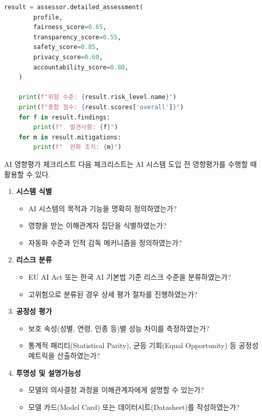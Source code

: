 \begin{lstlisting}[language=Python, caption={AI 영향평가 자동화 도구}, label={lst:impact_assessment}]
    result = assessor.detailed_assessment(
        profile,
        fairness_score=0.65,
        transparency_score=0.55,
        safety_score=0.85,
        privacy_score=0.60,
        accountability_score=0.80,
    )

    print(f"위험 수준: {result.risk_level.name}")
    print(f"종합 점수: {result.scores['overall']}")
    for f in result.findings:
        print(f"  발견사항: {f}")
    for m in result.mitigations:
        print(f"  완화 조치: {m}")
\end{lstlisting}

\begin{practicaltool}{AI 영향평가 체크리스트}
다음 체크리스트는 AI 시스템 도입 전 영향평가를 수행할 때 활용할 수 있다.

\begin{enumerate}
 \item \textbf{시스템 식별}
 \begin{itemize}
  \item[$\square$] AI 시스템의 목적과 기능을 명확히 정의하였는가?
  \item[$\square$] 영향을 받는 이해관계자 집단을 식별하였는가?
  \item[$\square$] 자동화 수준과 인적 감독 메커니즘을 정의하였는가?
 \end{itemize}

 \item \textbf{리스크 분류}
 \begin{itemize}
  \item[$\square$] EU AI Act 또는 한국 AI 기본법 기준 리스크 수준을 분류하였는가?
  \item[$\square$] 고위험으로 분류된 경우 상세 평가 절차를 진행하였는가?
 \end{itemize}

 \item \textbf{공정성 평가}
 \begin{itemize}
  \item[$\square$] 보호 속성(성별, 연령, 인종 등)별 성능 차이를 측정하였는가?
  \item[$\square$] 통계적 패리티(Statistical Parity), 균등 기회(Equal Opportunity) 등 공정성 메트릭을 산출하였는가?
 \end{itemize}

 \item \textbf{투명성 및 설명가능성}
 \begin{itemize}
  \item[$\square$] 모델의 의사결정 과정을 이해관계자에게 설명할 수 있는가?
  \item[$\square$] 모델 카드(Model Card) 또는 데이터시트(Datasheet)를 작성하였는가?
 \end{itemize}


\end{enumerate}
\end{practicaltool}

